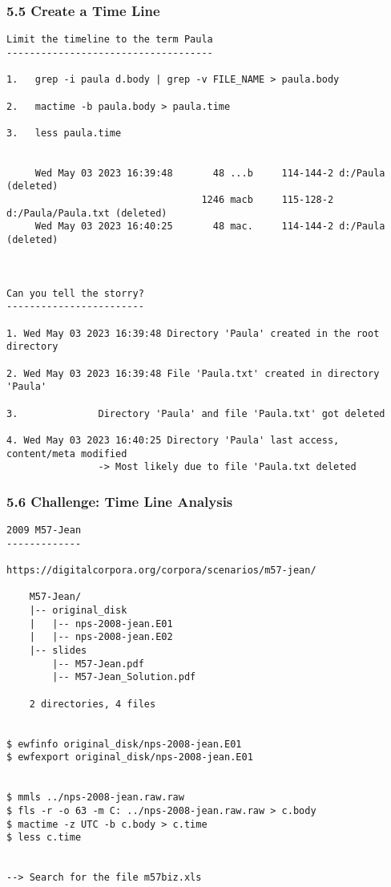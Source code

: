 \begin{frame}[fragile]
\frametitle{5.5 Create a Time Line}
  \begin{lstlisting}[basicstyle=\tiny]
Limit the timeline to the term Paula
------------------------------------

1.   grep -i paula d.body | grep -v FILE_NAME > paula.body

2.   mactime -b paula.body > paula.time

3.   less paula.time


     Wed May 03 2023 16:39:48       48 ...b     114-144-2 d:/Paula (deleted)
                                  1246 macb     115-128-2 d:/Paula/Paula.txt (deleted)
     Wed May 03 2023 16:40:25       48 mac.     114-144-2 d:/Paula (deleted)



Can you tell the storry?
------------------------

1. Wed May 03 2023 16:39:48	Directory 'Paula' created in the root directory

2. Wed May 03 2023 16:39:48	File 'Paula.txt' created in directory 'Paula'

3.				Directory 'Paula' and file 'Paula.txt' got deleted

4. Wed May 03 2023 16:40:25	Directory 'Paula' last access, content/meta modified
				-> Most likely due to file 'Paula.txt deleted
  \end{lstlisting}
\end{frame}


\begin{frame}[fragile]
\frametitle{5.6 Challenge: Time Line Analysis}
  \begin{lstlisting}[basicstyle=\tiny]
2009 M57-Jean
-------------

https://digitalcorpora.org/corpora/scenarios/m57-jean/

	M57-Jean/
	|-- original_disk
	|   |-- nps-2008-jean.E01
	|   |-- nps-2008-jean.E02
	|-- slides
	    |-- M57-Jean.pdf
	    |-- M57-Jean_Solution.pdf

	2 directories, 4 files


$ ewfinfo original_disk/nps-2008-jean.E01
$ ewfexport original_disk/nps-2008-jean.E01


$ mmls ../nps-2008-jean.raw.raw
$ fls -r -o 63 -m C: ../nps-2008-jean.raw.raw > c.body
$ mactime -z UTC -b c.body > c.time
$ less c.time


--> Search for the file m57biz.xls
  \end{lstlisting}
\end{frame}




